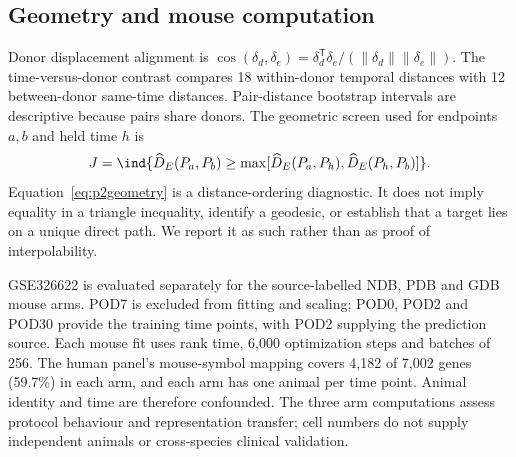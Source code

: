 \subsection{Geometry and mouse computation}
Donor displacement alignment is $\cos(\delta_d,\delta_e)=\delta_d^{\mathsf T}\delta_e/(\|\delta_d\|\|\delta_e\|)$. The time-versus-donor contrast compares 18 within-donor temporal distances with 12 between-donor same-time distances. Pair-distance bootstrap intervals are descriptive because pairs share donors. The geometric screen used for endpoints $a,b$ and held time $h$ is
\begin{equation}
J=\ind\{\widehat D_E(P_a,P_b)\geq\max[\widehat D_E(P_a,P_h),\widehat D_E(P_h,P_b)]\}.\label{eq:p2geometry}
\end{equation}
Equation~\eqref{eq:p2geometry} is a distance-ordering diagnostic. It does not imply equality in a triangle inequality, identify a geodesic, or establish that a target lies on a unique direct path. We report it as such rather than as proof of interpolability.

GSE326622 is evaluated separately for the source-labelled NDB, PDB and GDB mouse arms. POD7 is excluded from fitting and scaling; POD0, POD2 and POD30 provide the training time points, with POD2 supplying the prediction source. Each mouse fit uses rank time, 6,000 optimization steps and batches of 256. The human panel's mouse-symbol mapping covers 4,182 of 7,002 genes (59.7\%) in each arm, and each arm has one animal per time point. Animal identity and time are therefore confounded. The three arm computations assess protocol behaviour and representation transfer; cell numbers do not supply independent animals or cross-species clinical validation.

